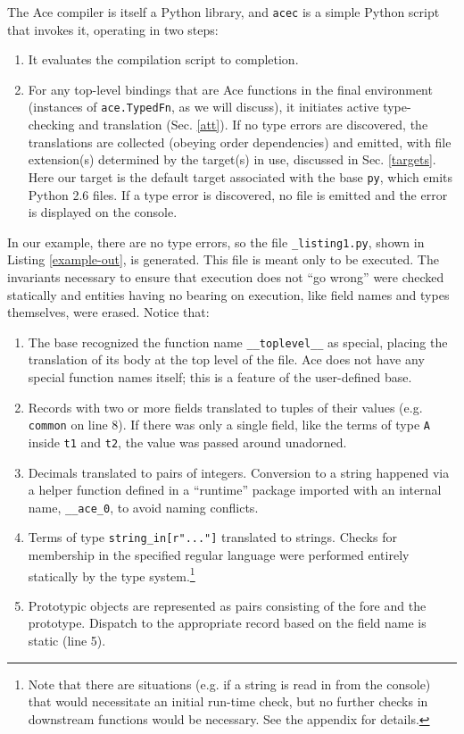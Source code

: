 \documentclass[10pt,preprint]{sigplanconf}
\begin{document}
{The Ace compiler is itself a Python library, and \verb|acec| is a simple Python script that invokes it, operating in two steps:
\begin{enumerate}
\item It evaluates the compilation script to completion.
\item For any top-level bindings that are Ace functions in the final environment (instances of \verb|ace.TypedFn|, as we will discuss), it initiates active type-checking and translation (Sec. \ref{att}). If no type errors are discovered, the translations are collected (obeying order dependencies) and emitted, with file extension(s) determined by the target(s) in use, discussed in Sec. \ref{targets}. Here our target is  the default target associated with the base \verb|py|, which emits Python 2.6 files. If a type error is discovered, no file is emitted and the error is displayed on the console.
\end{enumerate}

In our example, there are no type errors, so the file \verb|_listing1.py|, shown in Listing \ref{example-out},  is generated. This file is meant only to be executed. The invariants necessary to ensure that execution does not ``go wrong'' were checked statically and entities having no bearing on execution, like field names and types themselves, were erased. Notice that:
\begin{enumerate}
\item The base recognized the function name \verb|__toplevel__| as special, placing the translation of its body  at the top level of the file. Ace does not have any special function names itself; this is a feature of the user-defined base.
\item Records with two or more fields translated to tuples of their values (e.g. \verb|common| on line 8). If there was only a single field, like the terms of type \verb|A| inside \verb|t1| and \verb|t2|, the value was passed around unadorned. 
\item Decimals translated to pairs of integers. Conversion to a string happened via a helper function defined in a ``runtime'' package imported with an internal name, \verb|__ace_0|, to avoid naming conflicts. 
\item Terms of type \verb|string_in[r"..."]| translated to strings. Checks for membership in the specified regular language were performed entirely statically by the type system.\footnote{Note that there are situations (e.g. if a string is read in from the console) that would necessitate an initial run-time check, but no further checks in downstream functions would be necessary. See the appendix for details.}
\item Prototypic objects are represented as pairs consisting of the fore and the prototype. Dispatch to the appropriate record based on the field name is static (line 5).
\end{enumerate}

}
\end{document}
